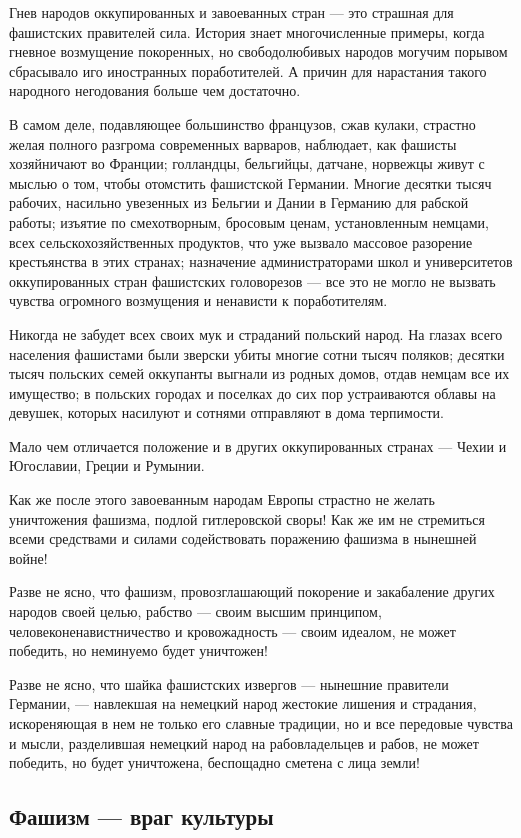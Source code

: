 \documentclass[12pt, a4paper, openany]{book}
\begin{document}
Гнев народов оккупированных и завоеванных стран — это страшная для фашистских правителей сила. История знает многочисленные примеры, когда гневное возмущение покоренных, но свободолюбивых народов могучим порывом сбрасывало иго иностранных поработителей. А причин для нарастания такого народного негодования больше чем достаточно.

В самом деле, подавляющее большинство французов, сжав кулаки, страстно желая полного разгрома современных варваров, наблюдает, как фашисты хозяйничают во Франции; голландцы, бельгийцы, датчане, норвежцы живут с мыслью о том, чтобы отомстить фашистской Германии. Многие десятки тысяч рабочих, насильно увезенных из Бельгии и Дании в Германию для рабской работы; изъятие по смехотворным, бросовым ценам, установленным немцами, всех сельскохозяйственных продуктов, что уже вызвало массовое разорение крестьянства в этих странах; назначение администраторами школ и университетов оккупированных стран фашистских головорезов — все это не могло не вызвать чувства огромного возмущения и ненависти к поработителям.

Никогда не забудет всех своих мук и страданий польский народ. На глазах всего населения фашистами были зверски убиты многие сотни тысяч поляков; десятки тысяч польских семей оккупанты выгнали из родных домов, отдав немцам все их имущество; в польских городах и поселках до сих пор устраиваются облавы на девушек, которых насилуют и сотнями отправляют в дома терпимости.

Мало чем отличается положение и в других оккупированных странах — Чехии и Югославии, Греции и Румынии.

Как же после этого завоеванным народам Европы страстно не желать уничтожения фашизма, подлой гитлеровской своры! Как же им не стремиться всеми средствами и силами содействовать поражению фашизма в нынешней войне!

Разве не ясно, что фашизм, провозглашающий покорение и закабаление других народов своей целью, рабство — своим высшим принципом, человеконенавистничество и кровожадность — своим идеалом, не может победить, но неминуемо будет уничтожен!

Разве не ясно, что шайка фашистских извергов — нынешние правители Германии, — навлекшая на немецкий народ жестокие лишения и страдания, искореняющая в нем не только его славные традиции, но и все передовые чувства и мысли, разделившая немецкий народ на рабовладельцев и рабов, не может победить, но будет уничтожена, беспощадно сметена с лица земли!


	\subsection*{\center \textbf{Фашизм --- враг культуры}}
\end{document}
